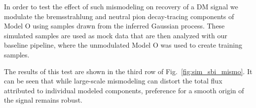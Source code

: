 \documentclass[prd,aps,10pt,nofootinbib,twocolumn,superscriptaddress,preprintnumbers,balancelastpage,longbibliography]{revtex4-1}
\begin{document}
In order to test the effect of such mismodeling on recovery of a DM signal we modulate the bremsstrahlung and neutral pion decay-tracing components of Model O using samples drawn from the inferred Gaussian process. These simulated samples are used as mock data that are then analyzed with our baseline pipeline, where the unmodulated Model O was used to create training samples.

The results of this test are shown in the third row of Fig.~\ref{fig:sim_sbi_mismo}. It can be seen that while large-scale mismodeling can distort the total flux attributed to individual modeled components, preference for a smooth origin of the signal remains robust. \\

\end{document}
